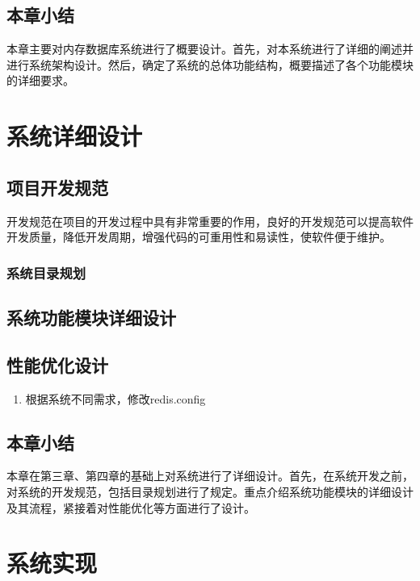 \documentclass{zjutthesis}
\begin{document}
\section{本章小结}
本章主要对内存数据库系统进行了概要设计。首先，对本系统进行了详细的阐述并进行系统架构设计。然后，确定了系统的总体功能结构，概要描述了各个功能模块的详细要求。


\chapter{系统详细设计}
\section{项目开发规范}
开发规范在项目的开发过程中具有非常重要的作用，良好的开发规范可以提高软件开发质量，降低开发周期，增强代码的可重用性和易读性，使软件便于维护。

\subsection{系统目录规划}

\section{系统功能模块详细设计}

\section{性能优化设计}
\begin{enumerate}[label=（\arabic*）]
\item{根据系统不同需求，修改redis.config}
\end{enumerate}

\section{本章小结}
本章在第三章、第四章的基础上对系统进行了详细设计。首先，在系统开发之前，对系统的开发规范，包括目录规划进行了规定。重点介绍系统功能模块的详细设计及其流程，紧接着对性能优化等方面进行了设计。


\chapter{系统实现}
\end{document}
